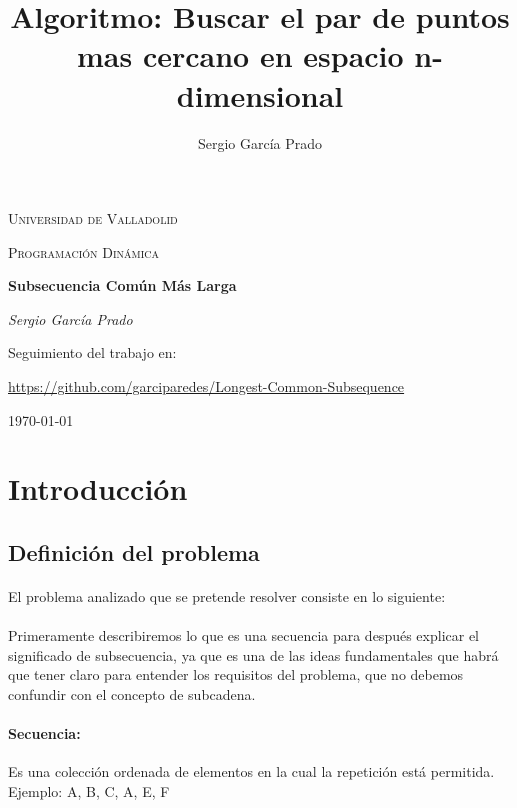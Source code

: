\documentclass{article}
\title{Algoritmo: Buscar el par de puntos mas cercano en espacio n-dimensional}
\author{Sergio García Prado}
\begin{document}
\begin{titlepage}
	\centering
	{\scshape\LARGE Universidad de Valladolid \par}
	\vspace{1cm}
	{\scshape\Large Programación Dinámica\par}
	\vspace{1.5cm}
	{\huge\bfseries Subsecuencia Común Más Larga\par}
	\vspace{2cm}
	{\Large\itshape Sergio García Prado\par}

	\vfill
	Seguimiento del trabajo en: \par
	\href{https://github.com/garciparedes/Longest-Common-Subsequence}{https://github.com/garciparedes/Longest-Common-Subsequence}

	\vfill


	{\large \today\par}
\end{titlepage}

\section{Introducción}

	\subsection{Definición del problema}

		\paragraph{}
		El problema analizado que se pretende resolver consiste en lo siguiente:

		\paragraph{}
		Primeramente describiremos lo que es una secuencia para después explicar el significado de subsecuencia, ya que es una de las ideas fundamentales que habrá que tener claro para entender los requisitos del problema, que no debemos confundir con el concepto de  subcadena.

		\paragraph{Secuencia:}
		Es una colección ordenada de elementos en la cual la repetición está permitida.
		\newline{}
		Ejemplo: {A, B, C, A, E, F}
\end{document}
